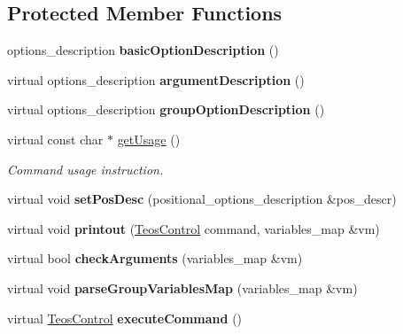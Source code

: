 \subsection*{Protected Member Functions}
\begin{DoxyCompactItemize}
\item 
\mbox{\label{classteos_1_1_control_options_a490f2d5ea05e92a5996beaa6d40c5c32}} 
options\+\_\+description {\bfseries basic\+Option\+Description} ()
\item 
\mbox{\label{classteos_1_1_control_options_a611508b33386c2a2465e68b333b51c5f}} 
virtual options\+\_\+description {\bfseries argument\+Description} ()
\item 
\mbox{\label{classteos_1_1_control_options_a1b39c9263e1abea919db8097b46ecfae}} 
virtual options\+\_\+description {\bfseries group\+Option\+Description} ()
\item 
virtual const char $\ast$ \mbox{\hyperlink{classteos_1_1_control_options_a0aa5671f9bc750ed5280c26c543874f3}{get\+Usage}} ()
\begin{DoxyCompactList}\small\item\em Command \textquotesingle{}usage\textquotesingle{} instruction. \end{DoxyCompactList}\item 
\mbox{\label{classteos_1_1_control_options_a606085ad334d59eafc103be85e3be146}} 
virtual void {\bfseries set\+Pos\+Desc} (positional\+\_\+options\+\_\+description \&pos\+\_\+descr)
\item 
\mbox{\label{classteos_1_1_control_options_a33001fdd58dea6056f683a8e280c245e}} 
virtual void {\bfseries printout} (\mbox{\hyperlink{classteos_1_1_teos_control}{Teos\+Control}} command, variables\+\_\+map \&vm)
\item 
\mbox{\label{classteos_1_1_control_options_a2916fdad936906cec8496b5952936cae}} 
virtual bool {\bfseries check\+Arguments} (variables\+\_\+map \&vm)
\item 
\mbox{\label{classteos_1_1_control_options_a46025212b1afd9b9e56914844512ac24}} 
virtual void {\bfseries parse\+Group\+Variables\+Map} (variables\+\_\+map \&vm)
\item 
\mbox{\label{classteos_1_1_control_options_afc04b2ed27c6b2497a95890498d403d0}} 
virtual \mbox{\hyperlink{classteos_1_1_teos_control}{Teos\+Control}} {\bfseries execute\+Command} ()
\end{DoxyCompactItemize}
